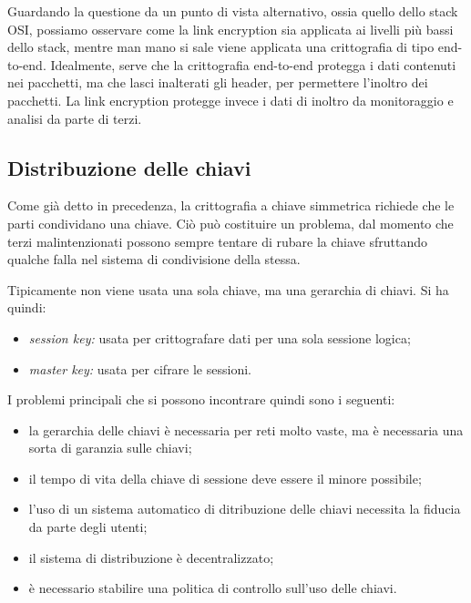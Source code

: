 \documentclass[a4paper, 10pt, twoside]{article}
\begin{document}
	Guardando la questione da un punto di vista alternativo, ossia quello dello stack OSI, possiamo osservare come la link encryption sia applicata ai livelli più bassi dello stack, mentre man mano si sale viene applicata una crittografia di tipo end-to-end. Idealmente, serve che la crittografia end-to-end protegga i dati contenuti nei pacchetti, ma che lasci inalterati gli header, per permettere l'inoltro dei pacchetti. La link encryption protegge invece i dati di inoltro da monitoraggio e analisi da parte di terzi.
	
	\subsection{Distribuzione delle chiavi}
	Come già detto in precedenza, la crittografia a chiave simmetrica richiede che le parti condividano una chiave. Ciò può costituire un problema, dal momento che terzi malintenzionati possono sempre tentare di rubare la chiave sfruttando qualche falla nel sistema di condivisione della stessa.
	
	Tipicamente non viene usata una sola chiave, ma una gerarchia di chiavi. Si ha quindi:\begin{itemize}
		\item \textit{session key:} usata per crittografare dati per una sola sessione logica;
		\item \textit{master key:} usata per cifrare le sessioni.
	\end{itemize}

	I problemi principali che si possono incontrare quindi sono i seguenti: \begin{itemize}
		\item la gerarchia delle chiavi è necessaria per reti molto vaste, ma è necessaria una sorta di garanzia sulle chiavi;
		
		\item il tempo di vita della chiave di sessione deve essere il minore possibile;
		
		\item l'uso di un sistema automatico di ditribuzione delle chiavi necessita la fiducia da parte degli utenti;
		
		\item il sistema di distribuzione è decentralizzato;
		
		\item è necessario stabilire una politica di controllo sull'uso delle chiavi.
	\end{itemize}
\end{document}
